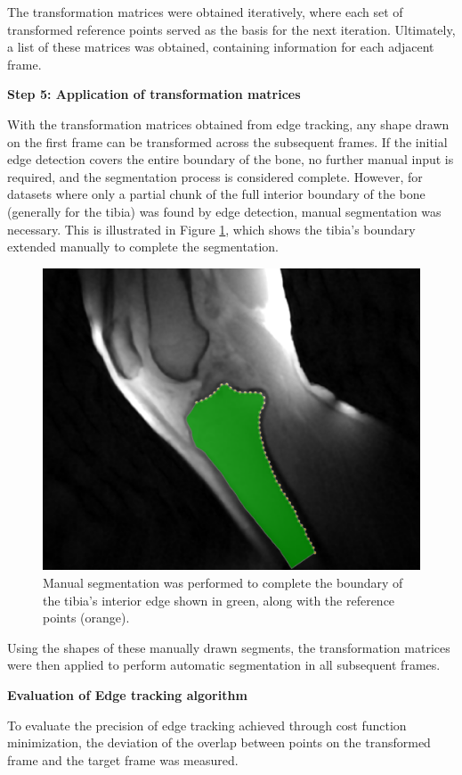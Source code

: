 \documentclass{micro-econ-thesis}
\begin{document}
The transformation matrices were obtained iteratively, where each set of transformed reference points served as the basis for the next iteration. Ultimately, a list of these matrices was obtained, containing information for each adjacent frame. 


\textbf{Step 5: Application of transformation matrices }

With the transformation matrices obtained from edge tracking, any shape drawn on the first frame can be transformed across the subsequent frames. If the initial edge detection covers the entire boundary of the bone, no further manual input is required, and the segmentation process is considered complete. However, for datasets where only a partial chunk of the full interior boundary of the bone (generally for the tibia) was found by edge detection, manual segmentation was necessary. This is illustrated in Figure \ref{fig:manualsegment}, which shows the tibia's boundary extended manually to complete the segmentation. 

\begin{figure} [H]
	\centering
	\includegraphics[width=0.7\linewidth]{manual_segment}
	\caption{Manual segmentation was performed to complete the boundary of the tibia's interior edge shown in green, along with the reference points (orange).}
	\label{fig:manualsegment}
\end{figure}

Using the shapes of these manually drawn segments, the transformation matrices were then applied to perform automatic segmentation in all subsequent frames. 

\textbf{Evaluation of Edge tracking algorithm}

To evaluate the precision of edge tracking achieved through cost function minimization, the deviation of the overlap between points on the transformed frame and the target frame was measured. 
\end{document}
